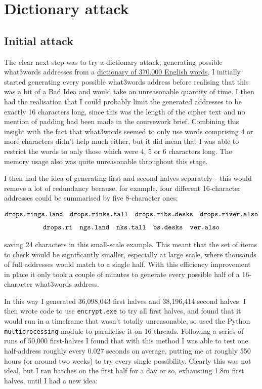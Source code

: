 \documentclass[11pt]{article} %
\newcommand{\textapprox}{\raisebox{0.5ex}{\texttildelow}}
\begin{document}
\section{Dictionary attack}

\subsection{Initial attack}

The clear next step was to try a dictionary attack, generating possible what3words addresses from a \href{https://github.com/dwyl/english-words/blob/master/words_dictionary.json}{dictionary of \textapprox{}370,000 English words}. I initially started generating every possible what3words address before realising that this was a bit of a Bad Idea and would take an unreasonable quantity of time. I then had the realisation that I could probably limit the generated addresses to be exactly 16 characters long, since this was the length of the cipher text and no mention of padding had been made in the coursework brief. Combining this insight with the fact that what3words seemed to only use words comprising 4 or more characters didn't help much either, but it did mean that I was able to restrict the words to only those which were 4, 5 or 6 characters long. The memory usage also was quite unreasonable throughout this stage.

I then had the idea of generating first and second halves separately - this would remove a lot of redundancy because, for example, four different 16-character addresses could be summarised by five 8-character ones:

$$
\begin{matrix}
\verb|drops.rings.land| & \verb|drops.rinks.tall| & \verb|drops.ribs.desks| & \verb|drops.river.also|
\end{matrix}
$$
$$
\begin{matrix}
\verb|drops.ri| & \verb|ngs.land| & \verb|nks.tall| & \verb|bs.desks| & \verb|ver.also|
\end{matrix}
$$

saving 24 characters in this small-scale example. This meant that the set of items to check would be significantly smaller, especially at large scale, where thousands of full addresses would match to a single half. With this efficiency improvement in place it only took a couple of minutes to generate every possible half of a 16-character what3words address.

In this way I generated 36,098,043 first halves and 38,196,414 second halves. I then wrote code to use \verb|encrypt.exe| to try all first halves, and found that it would run in a timeframe that wasn't totally unreasonable, so used the Python \verb|multiprocessing| module to parallelise it on 16 threads. Following a series of runs of 50,000 first-halves I found that with this method I was able to test one half-address roughly every 0.027 seconds on average, putting me at roughly 550 hours (or around two weeks) to try every single possibility. Clearly this was not ideal, but I ran batches on the first half for a day or so, exhausting \textapprox{}1.8m first halves, until I had a new idea:
\end{document}
